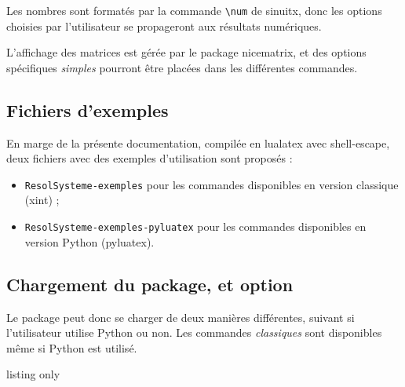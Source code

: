 \documentclass[french,a4paper,11pt]{article}
\begin{document}
\begin{importantblock}
Les nombres sont formatés par la commande \texttt{\textbackslash num} de \textsf{sinuitx}, donc les options choisies par l'utilisateur se propageront aux résultats numériques.

\smallskip

L'affichage des matrices est gérée par le package \textsf{nicematrix}, et des options spécifiques \textit{simples} pourront être placées dans les différentes commandes.
\end{importantblock}

\subsection{Fichiers d'exemples}

\begin{noteblock}
En marge de la présente documentation, compilée en \textsf{lualatex} avec \textsf{shell-escape}, deux fichiers avec des exemples d'utilisation sont proposés :

\begin{itemize}
	\item \texttt{ResolSysteme-exemples} pour les commandes disponibles en version classique (\textsf{xint}) ;
	\item \texttt{ResolSysteme-exemples-pyluatex} pour les commandes disponibles en version Python (\textsf{pyluatex}).
\end{itemize}
\vspace*{-\baselineskip}\leavevmode
\end{noteblock}

\pagebreak

\subsection{Chargement du package, et option}

\begin{importantblock}
Le package peut donc se charger de deux manières différentes, suivant si l'utilisateur utilise \textsf{Python} ou non. Les commandes \textit{classiques} sont disponibles même si \textsf{Python} est utilisé.
\end{importantblock}

\begin{PresentationCode}{listing only}
\usepackage{ResolSysteme}
\end{PresentationCode}
\end{document}
